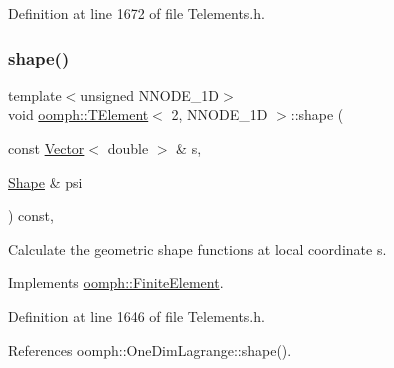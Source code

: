 Definition at line 1672 of file Telements.\+h.

\mbox{\label{classoomph_1_1TElement_3_012_00_01NNODE__1D_01_4_a21c1b5f546026b5d45c61e25e803feb7}} 
\subsubsection{\texorpdfstring{shape()}{shape()}}
{\footnotesize\ttfamily template$<$unsigned N\+N\+O\+D\+E\+\_\+1D$>$ \\
void \hyperlink{classoomph_1_1TElement}{oomph\+::\+T\+Element}$<$ 2, N\+N\+O\+D\+E\+\_\+1D $>$\+::shape (\begin{DoxyParamCaption}\item[{const \hyperlink{classoomph_1_1Vector}{Vector}$<$ double $>$ \&}]{s,  }\item[{\hyperlink{classoomph_1_1Shape}{Shape} \&}]{psi }\end{DoxyParamCaption}) const\hspace{0.3cm}{\ttfamily [inline]}, {\ttfamily [virtual]}}



Calculate the geometric shape functions at local coordinate s. 



Implements \hyperlink{classoomph_1_1FiniteElement_a58a25b6859ddd43b7bfe64a19fee5023}{oomph\+::\+Finite\+Element}.



Definition at line 1646 of file Telements.\+h.



References oomph\+::\+One\+Dim\+Lagrange\+::shape().

\mbox{\label{classoomph_1_1TElement_3_012_00_01NNODE__1D_01_4_a4f779eb32a1a91ae566a8a87ae6bc242}} 
